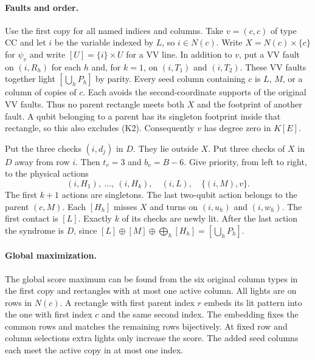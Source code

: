 \documentclass[10pt,twocolumn]{article}
\theoremstyle{definition}
\begin{document}
\paragraph{Faults and order.}
Use the first copy for all named indices and columns. Take $v=(c,c)$
of type CC and let $i$ be the variable indexed by $L$, so $i\in N(c)$.
Write $X=N(c)\times\{c\}$ for $\psi_v$ and write $[U]=\{i\}\times U$
for a VV line. In addition to $v$, put a VV fault on $(i,R_h)$ for
each $h$ and, for $k=1$, on $(i,T_1)$ and $(i,T_2)$. These VV
faults together light $[\bigcup_h P_h]$ by parity. Every seed
column containing $c$ is $L$, $M$, or a column of copies of $c$.
Each avoids the second-coordinate supports of the original VV
faults. Thus no parent rectangle meets both $X$ and the footprint
of another fault. A qubit belonging to a parent has its singleton
footprint inside that rectangle, so this also excludes (K2).
Consequently $v$ has degree zero in $K[E]$.

Put the three checks $(i,d_j)$ in $D$. They lie outside $X$.
Put three checks of $X$ in $D$ away from row $i$.
Then $t_v=3$ and $b_v=B-6$.
Give priority, from left to right, to the physical actions
\[
 (i,H_1),\ \ldots,\ (i,H_k),\quad (i,L),\quad
 \{(i,M),v\}.
\]
The first $k+1$ actions are singletons. The last two-qubit action
belongs to the parent $(c,M)$. Each $[H_h]$ misses $X$ and turns on
$(i,u_h)$ and $(i,w_h)$. The first contact is $[L]$. Exactly $k$
of its checks are newly lit. After the last action the syndrome is
$D$, since $[L]\oplus[M]\oplus\bigoplus_h[H_h]=[\bigcup_h P_h]$.

\paragraph{Global maximization.}
The global score maximum can be found from the six original column
types in the first copy and rectangles with at most one active
column. All lights are on rows in $N(c)$. A rectangle
with first parent index $r$ embeds its lit pattern into the one with
first index $c$ and the same second index. The embedding fixes the
common rows and matches the remaining rows bijectively. At fixed
row and column selections extra lights only increase the score.
The added seed columns each meet the active copy in at most one index.
\end{document}

